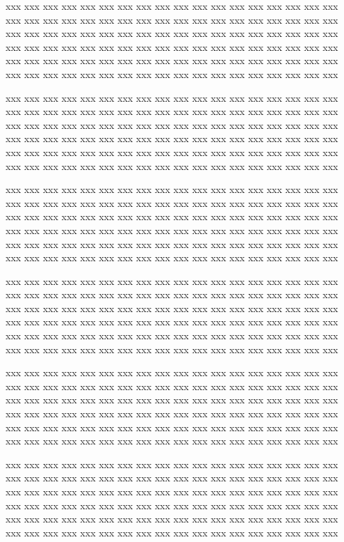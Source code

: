 \documentclass[10pt,twoside%
	]{article}
\begin{document}
\begin{discussion}
xxx xxx xxx xxx xxx xxx xxx xxx xxx xxx xxx xxx xxx xxx xxx xxx xxx xxx 
xxx xxx xxx xxx xxx xxx xxx xxx xxx xxx xxx xxx xxx xxx xxx xxx xxx xxx 
xxx xxx xxx xxx xxx xxx xxx xxx xxx xxx xxx xxx xxx xxx xxx xxx xxx xxx 
xxx xxx xxx xxx xxx xxx xxx xxx xxx xxx xxx xxx xxx xxx xxx xxx xxx xxx 
xxx xxx xxx xxx xxx xxx xxx xxx xxx xxx xxx xxx xxx xxx xxx xxx xxx xxx 
xxx xxx xxx xxx xxx xxx xxx xxx xxx xxx xxx xxx xxx xxx xxx xxx xxx xxx 

xxx xxx xxx xxx xxx xxx xxx xxx xxx xxx xxx xxx xxx xxx xxx xxx xxx xxx 
xxx xxx xxx xxx xxx xxx xxx xxx xxx xxx xxx xxx xxx xxx xxx xxx xxx xxx 
xxx xxx xxx xxx xxx xxx xxx xxx xxx xxx xxx xxx xxx xxx xxx xxx xxx xxx 
xxx xxx xxx xxx xxx xxx xxx xxx xxx xxx xxx xxx xxx xxx xxx xxx xxx xxx 
xxx xxx xxx xxx xxx xxx xxx xxx xxx xxx xxx xxx xxx xxx xxx xxx xxx xxx 
xxx xxx xxx xxx xxx xxx xxx xxx xxx xxx xxx xxx xxx xxx xxx xxx xxx xxx 

xxx xxx xxx xxx xxx xxx xxx xxx xxx xxx xxx xxx xxx xxx xxx xxx xxx xxx 
xxx xxx xxx xxx xxx xxx xxx xxx xxx xxx xxx xxx xxx xxx xxx xxx xxx xxx 
xxx xxx xxx xxx xxx xxx xxx xxx xxx xxx xxx xxx xxx xxx xxx xxx xxx xxx 
xxx xxx xxx xxx xxx xxx xxx xxx xxx xxx xxx xxx xxx xxx xxx xxx xxx xxx 
xxx xxx xxx xxx xxx xxx xxx xxx xxx xxx xxx xxx xxx xxx xxx xxx xxx xxx 
xxx xxx xxx xxx xxx xxx xxx xxx xxx xxx xxx xxx xxx xxx xxx xxx xxx xxx 

xxx xxx xxx xxx xxx xxx xxx xxx xxx xxx xxx xxx xxx xxx xxx xxx xxx xxx 
xxx xxx xxx xxx xxx xxx xxx xxx xxx xxx xxx xxx xxx xxx xxx xxx xxx xxx 
xxx xxx xxx xxx xxx xxx xxx xxx xxx xxx xxx xxx xxx xxx xxx xxx xxx xxx 
xxx xxx xxx xxx xxx xxx xxx xxx xxx xxx xxx xxx xxx xxx xxx xxx xxx xxx 
xxx xxx xxx xxx xxx xxx xxx xxx xxx xxx xxx xxx xxx xxx xxx xxx xxx xxx 
xxx xxx xxx xxx xxx xxx xxx xxx xxx xxx xxx xxx xxx xxx xxx xxx xxx xxx 

xxx xxx xxx xxx xxx xxx xxx xxx xxx xxx xxx xxx xxx xxx xxx xxx xxx xxx 
xxx xxx xxx xxx xxx xxx xxx xxx xxx xxx xxx xxx xxx xxx xxx xxx xxx xxx 
xxx xxx xxx xxx xxx xxx xxx xxx xxx xxx xxx xxx xxx xxx xxx xxx xxx xxx 
xxx xxx xxx xxx xxx xxx xxx xxx xxx xxx xxx xxx xxx xxx xxx xxx xxx xxx 
xxx xxx xxx xxx xxx xxx xxx xxx xxx xxx xxx xxx xxx xxx xxx xxx xxx xxx 
xxx xxx xxx xxx xxx xxx xxx xxx xxx xxx xxx xxx xxx xxx xxx xxx xxx xxx 

xxx xxx xxx xxx xxx xxx xxx xxx xxx xxx xxx xxx xxx xxx xxx xxx xxx xxx 
xxx xxx xxx xxx xxx xxx xxx xxx xxx xxx xxx xxx xxx xxx xxx xxx xxx xxx 
xxx xxx xxx xxx xxx xxx xxx xxx xxx xxx xxx xxx xxx xxx xxx xxx xxx xxx 
xxx xxx xxx xxx xxx xxx xxx xxx xxx xxx xxx xxx xxx xxx xxx xxx xxx xxx 
xxx xxx xxx xxx xxx xxx xxx xxx xxx xxx xxx xxx xxx xxx xxx xxx xxx xxx 
xxx xxx xxx xxx xxx xxx xxx xxx xxx xxx xxx xxx xxx xxx xxx xxx xxx xxx 


\end{discussion}
\end{document}
